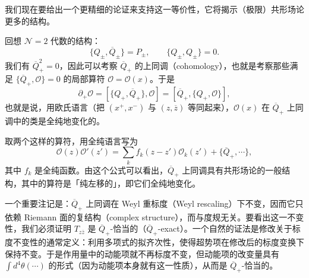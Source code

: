 
我们现在要给出一个更精细的论证来支持这一等价性，它将揭示（极限）共形场论更多的结构。


回想 $\mathcal{N}=2$ 代数的结构：
\[
  \{Q_\pm,\overline{Q}_\pm\}=P_\pm,\qquad \{Q_\pm,Q_\pm\}=0 .
\]
我们有 $\overline{Q}_+^2=0$，因此可以考察 $\overline{Q}_+$ 的上同调（cohomology），也就是考察那些满足 $\{\overline{Q}_+,\mathcal{O}\}=0$ 的局部算符 $\mathcal{O}=\mathcal{O}(x)$。于是
\[
  \partial_+\mathcal{O}=[\{Q_+,\overline{Q}_+\},\mathcal{O}]
  =[\overline{Q}_+,\{Q_+,\mathcal{O}\}],
\]
也就是说，用欧氏语言（把 $(x^+,x^-)$ 与 $(z,\overline{z})$ 等同起来），$\mathcal{O}(x)$ 在 $\overline{Q}_+$ 上同调中的类是全纯地变化的。

取两个这样的算符，用全纯语言写为
\[
  \mathcal{O}(z)\mathcal{O}'(z')=\sum_k f_k(z-z')\mathcal{O}_k(z')
  +\{\overline{Q}_+,\cdots\},
\]
其中 $f_k$ 是全纯函数。由这个公式可以看出，$\overline{Q}_+$ 上同调具有共形场论的一般结构，其中的算符是「纯左移的」，即它们全纯地变化。

一个重要注记是：$\overline{Q}_+$ 上同调在 Weyl 重标度（Weyl rescaling）下不变，因而它只依赖 Riemann 面的复结构（complex structure），而与度规无关。要看出这一不变性，我们必须证明 $T_{z\overline{z}}$ 是 $\overline{Q}_+$-恰当的（$\overline{Q}_+$-exact）。一个自然的证法是修改关于标度不变性的通常定义：利用多项式的拟齐次性，使得超势项在修改后的标度变换下保持不变。于是作用量中的动能项就不再标度不变，但动能项的改变量具有 $\int d^4\theta(\cdots)$ 的形式（因为动能项本身就有这一性质），从而是 $\overline{Q}_+$-恰当的。



